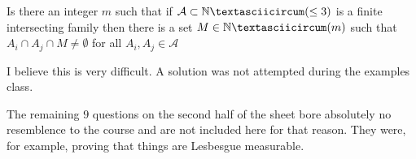 \documentclass[a4paper]{article}
\renewcommand{\A}{\mathcal{A}}
\begin{document}
  \begin{question}[Question 17]
    Is there an integer $m$ such that if $\A \subset \Nˆ{(\leq 3)}$ is a finite
    intersecting family then there is a set $M \in \Nˆ{(m)}$ such that $A_i \cap
    A_j \cap M \neq \emptyset$ for all $A_i, A_j \in \A$
  \end{question}
  \begin{remark}
    I believe this is very difficult. A solution was not attempted during the
    examples class.
  \end{remark}

  The remaining $9$ questions on the second half of the sheet bore absolutely no
  resemblence to the course and are not included here for that reason. They
  were, for example, proving that things are Lesbesgue measurable.
  
\end{document}

